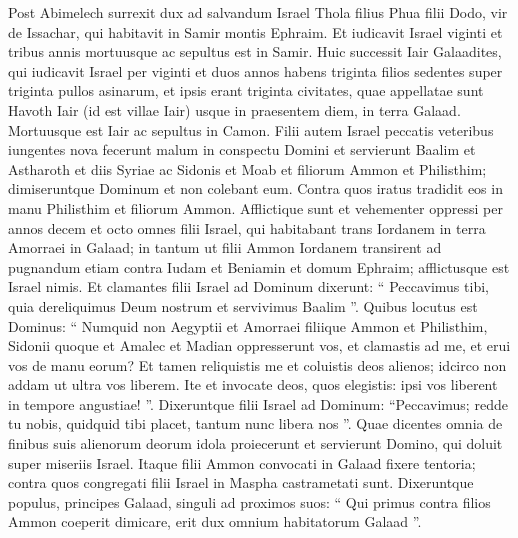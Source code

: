 \begin{biblechapter}
\begin{biblechapter}
\begin{biblechapter}
\begin{biblechapter}
\begin{biblechapter}
\begin{biblechapter}
\begin{biblechapter}
\begin{biblechapter}
\begin{biblechapter}
\begin{biblechapter}
\verse Post Abimelech surrexit dux ad salvandum Israel Thola filius Phua filii Dodo, vir de Issachar, qui habitavit in Samir montis Ephraim. 
\verse Et iudicavit Israel viginti et tribus annis mortuusque ac sepultus est in Samir.
 \verse Huic successit Iair Galaadites, qui iudicavit Israel per viginti et duos annos 
\verse habens triginta filios sedentes super triginta pullos asinarum, et ipsis erant triginta civitates, quae appellatae sunt Havoth Iair (id est villae Iair) usque in praesentem diem, in terra Galaad. 
\verse Mortuusque est Iair ac sepultus in Camon.
 \verse Filii autem Israel peccatis veteribus iungentes nova fecerunt malum in conspectu Domini et servierunt Baalim et Astharoth et diis Syriae ac Sidonis et Moab et filiorum Ammon et Philisthim; dimiseruntque Dominum et non colebant eum. 
\verse Contra quos iratus tradidit eos in manu Philisthim et filiorum Ammon. 
 \verse Afflictique sunt et vehementer oppressi per annos decem et octo omnes filii Israel, qui habitabant trans Iordanem in terra Amorraei in Galaad; 
\verse in tantum ut filii Ammon Iordanem transirent ad pugnandum etiam contra Iudam et Beniamin et domum Ephraim; afflictusque est Israel nimis.
 \verse Et clamantes filii Israel ad Dominum dixerunt: “ Peccavimus tibi, quia dereliquimus Deum nostrum et servivimus Baalim ”.
 \verse Quibus locutus est Dominus: “ Numquid non Aegyptii et Amorraei filiique Ammon et Philisthim, 
\verse Sidonii quoque et Amalec et Madian oppresserunt vos, et clamastis ad me, et erui vos de manu eorum? 
\verse Et tamen reliquistis me et coluistis deos alienos; idcirco non addam ut ultra vos liberem. 
\verse Ite et invocate deos, quos elegistis: ipsi vos liberent in tempore angustiae! ”. 
\verse Dixeruntque filii Israel ad Dominum: “Peccavimus; redde tu nobis, quidquid tibi placet, tantum nunc libera nos ”. 
\verse Quae dicentes omnia de finibus suis alienorum deorum idola proiecerunt et servierunt Domino, qui doluit super miseriis Israel.
 \verse Itaque filii Ammon convocati in Galaad fixere tentoria; contra quos congregati filii Israel in Maspha castrametati sunt. 
\verse Dixeruntque populus, principes Galaad, singuli ad proximos suos: “ Qui primus contra filios Ammon coeperit dimicare, erit dux omnium habitatorum Galaad ”.
 

\end{biblechapter}
\end{biblechapter}
\end{biblechapter}
\end{biblechapter}
\end{biblechapter}
\end{biblechapter}
\end{biblechapter}
\end{biblechapter}
\end{biblechapter}
\end{biblechapter}

